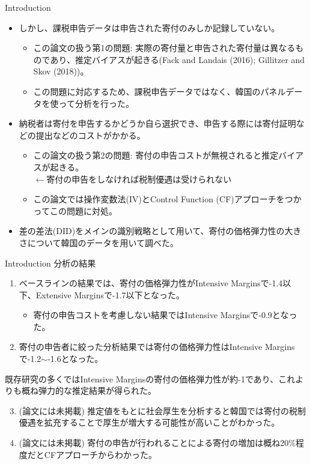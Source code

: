 \documentclass[dvipdfmx,10pt]{beamer}
\begin{document}
	\begin{frame}{Introduction}
		\protect\hypertarget{introduction-1}{}
		\begin{itemize}
			\item しかし、課税申告データは申告された寄付のみしか記録していない。
			\begin{itemize}
				\item この論文の扱う第1の問題: 実際の寄付量と申告された寄付量は異なるものであり、推定バイアスが起きる(Fack and Landais (2016); Gillitzer and Skov (2018))。
				\item この問題に対応するため、課税申告データではなく、韓国のパネルデータを使って分析を行った。
			\end{itemize}
			\item 納税者は寄付を申告するかどうか自ら選択でき、申告する際には寄付証明などの提出などのコストがかかる。			
			\begin{itemize}
				\item この論文の扱う第2の問題: 寄付の申告コストが無視されると推定バイアスが起きる。\\
				$\leftarrow$寄付の申告をしなければ税制優遇は受けられない
				\item この論文では操作変数法(IV)とControl Function (CF)アプローチをつかってこの問題に対処。
			\end{itemize}
			\item 差の差法(DID)をメインの識別戦略として用いて、寄付の価格弾力性の大きさについて韓国のデータを用いて調べた。
		\end{itemize}
	\end{frame}
	
	\begin{frame}{Introduction}
		\protect\hypertarget{introduction-2}{}
		分析の結果
		\begin{enumerate}
			\item ベースラインの結果では、寄付の価格弾力性がIntensive Marginsで-1.4以下、Extensive Marginsで-1.7以下となった。
			\begin{itemize}
				\item 寄付の申告コストを考慮しない結果ではIntensive Marginsで-0.9となった。
			\end{itemize}
			\item 寄付の申告者に絞った分析結果では寄付の価格弾力性はIntensive Marginsで-1.2\(\sim\)-1.6となった。
		\end{enumerate}
		既存研究の多くではIntensive Marginsの寄付の価格弾力性が約-1であり、これよりも概ね弾力的な推定結果が得られた。
		\begin{enumerate}
			\setcounter{enumi}{2}
			\item (論文には未掲載) 推定値をもとに社会厚生を分析すると韓国では寄付の税制優遇を拡充することで厚生が増大する可能性が高いことがわかった。
			\item (論文には未掲載) 寄付の申告が行われることによる寄付の増加は概ね20\%程度だとCFアプローチからわかった。
		\end{enumerate}
	\end{frame}
	
\end{document}
